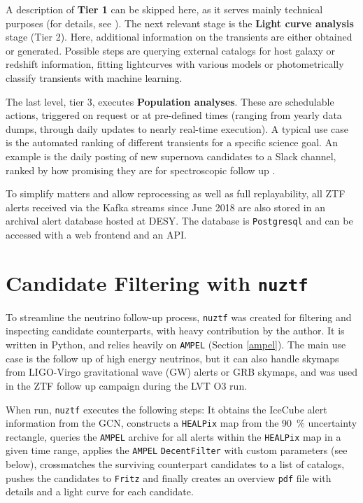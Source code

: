 \documentclass[
    a4paper, %
    fontsize=10pt, %
    twoside=true, %
    numbers=noenddot, %
    fontmethod=tex,
]{kaobook}
\begin{document}
A description of \textbf{Tier 1} can be skipped here, as it serves mainly technical purposes (for details, see \cite{Nordin2019}). The next relevant stage is the \textbf{Light curve analysis} stage (Tier 2). Here, additional information on the transients are either obtained or generated. Possible steps are querying external catalogs for host galaxy or redshift information, fitting lightcurves with various models or photometrically classify transients with machine learning.

The last level, tier 3, executes \textbf{Population analyses}. These are schedulable actions, triggered on request or at pre-defined times (ranging from yearly data dumps, through daily updates to nearly real-time execution). A typical use case is the automated ranking of different transients for a specific science goal. An example is the daily posting of new supernova candidates to a Slack channel, ranked by how promising they are for spectroscopic follow up \cite{Nordin2019}.

To simplify matters and allow reprocessing as well as full replayability, all ZTF alerts received via the Kafka streams since June 2018 are also stored in an archival alert database hosted at DESY. The database is \texttt{Postgresql} and can be accessed with a web frontend and an API.

\section{Candidate Filtering with \texttt{nuztf}}
To streamline the neutrino follow-up process, \texttt{nuztf}  was created for filtering and inspecting candidate counterparts, with heavy contribution by the author. It is written in Python, and relies heavily on \texttt{AMPEL} (Section \ref{ampel}). The main use case is the follow up of high energy neutrinos, but it can also handle skymaps from LIGO-Virgo  gravitational wave (GW) alerts or GRB skymaps, and was used in the ZTF follow up campaign  during the LVT O3 run.

When run, \texttt{nuztf} executes the following steps: It obtains the IceCube alert information from the GCN, constructs a \texttt{HEALPix} map from the \SI{90}{\percent} uncertainty rectangle, queries the \texttt{AMPEL} archive for all alerts within the \texttt{HEALPix} map in a given time range, applies the \texttt{AMPEL} \texttt{DecentFilter} \cite{Nordin2019} with custom parameters (see below), crossmatches the surviving counterpart candidates to a list of catalogs, pushes the candidates to \texttt{Fritz} and finally creates an overview \texttt{pdf} file with details and a light curve for each candidate.
\end{document}
